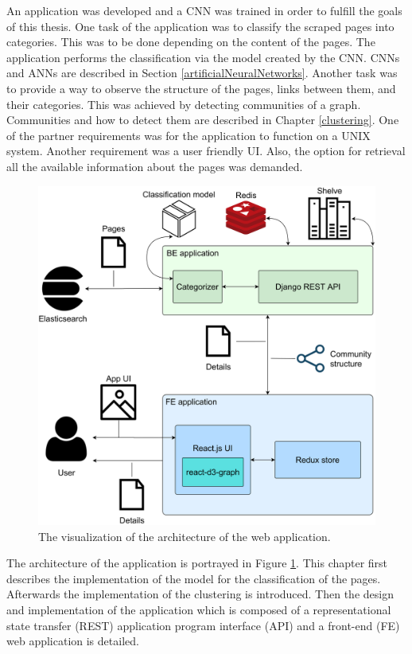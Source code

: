 \label{developmentIntroduction}
An application was developed and a CNN was trained in order to fulfill the goals of this thesis. One task of the application was to classify the scraped pages into categories. This was to be done depending on the content of the pages. The application performs the classification via the model created by the CNN. CNNs and ANNs are described in Section \ref{artificialNeuralNetworks}. Another task was to provide a way to observe the structure of the pages, links between them, and their categories. This was achieved by detecting communities of a graph. Communities and how to detect them are described in Chapter \ref{clustering}. One of the partner requirements was for the application to function on a UNIX system. Another requirement was a user friendly UI. Also, the option for retrieval all the available information about the pages was demanded. 

\begin{figure}
  \centering
  \includegraphics[width = \textwidth]{Images/ApplicationArchitecture.png}
  \caption{The visualization of the architecture of the web application.}
  \label{ApplicationArchitecture}
\end{figure}

The architecture of the application is portrayed in Figure \ref{ApplicationArchitecture}. This chapter first describes the implementation of the model for the classification of the pages. Afterwards the implementation of the clustering is introduced. Then the design and implementation of the application which is composed of a representational state transfer (REST) application program interface (API) and a front-end (FE) web application is detailed. 


